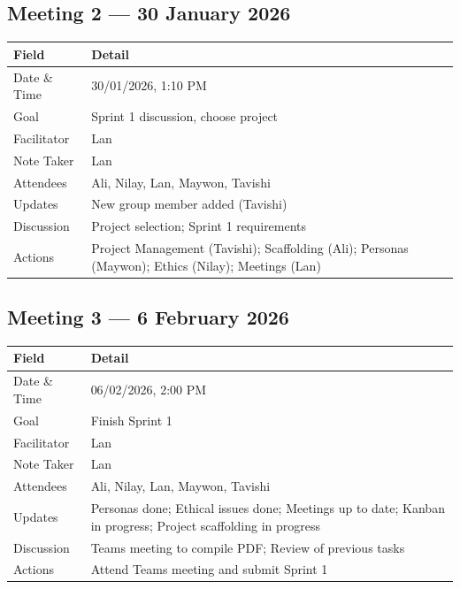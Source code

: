 \documentclass[11pt,a4paper]{article}
\begin{document}
\subsection{Meeting 2 — 30 January 2026}
\begin{table}[H]
\centering
\begin{tabularx}{\textwidth}{lX}
    \toprule
    \textbf{Field} & \textbf{Detail} \\
    \midrule
    Date \& Time    & 30/01/2026, 1:10 PM \\
    Goal            & Sprint 1 discussion, choose project \\
    Facilitator     & Lan \\
    Note Taker      & Lan \\
    Attendees       & Ali, Nilay, Lan, Maywon, Tavishi \\
    \midrule
    Updates         & New group member added (Tavishi) \\
    Discussion      & Project selection; Sprint 1 requirements \\
    Actions         & Project Management (Tavishi); Scaffolding (Ali); Personas (Maywon); Ethics (Nilay); Meetings (Lan) \\
    \bottomrule
\end{tabularx}
\end{table}

\subsection{Meeting 3 — 6 February 2026}
\begin{table}[H]
\centering
\begin{tabularx}{\textwidth}{lX}
    \toprule
    \textbf{Field} & \textbf{Detail} \\
    \midrule
    Date \& Time    & 06/02/2026, 2:00 PM \\
    Goal            & Finish Sprint 1 \\
    Facilitator     & Lan \\
    Note Taker      & Lan \\
    Attendees       & Ali, Nilay, Lan, Maywon, Tavishi \\
    \midrule
    Updates         & Personas done; Ethical issues done; Meetings up to date; Kanban in progress; Project scaffolding in progress \\
    Discussion      & Teams meeting to compile PDF; Review of previous tasks \\
    Actions         & Attend Teams meeting and submit Sprint 1 \\
    \bottomrule
\end{tabularx}
\end{table}
\end{document}
